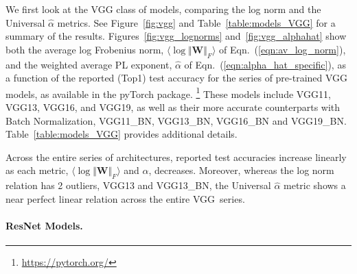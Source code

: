 We first look at the VGG class of models, comparing the log norm and the Universal $\hat{\alpha}$ metrics.
See Figure~\ref{fig:vgg} and Table~\ref{table:models_VGG} for a summary of the results.
Figures~\ref{fig:vgg_lognorms} and~\ref{fig:vgg_alphahat} show both the average log Frobenius norm, $\langle\log\Vert\mathbf{W}\Vert_{F}\rangle$ of Eqn.~(\ref{eqn:av_log_norm}), and the weighted average PL exponent, $\hat{\alpha}$ of Eqn.~(\ref{eqn:alpha_hat_specific}), as a function of the reported (Top1) test accuracy for the series of pre-trained VGG models, as available in the pyTorch package.%
\footnote{\url{https://pytorch.org/}}
These models include VGG11, VGG13, VGG16, and VGG19, as well as their more accurate counterparts with Batch Normalization, VGG11\_BN, VGG13\_BN, VGG16\_BN and VGG19\_BN. 
Table~\ref{table:models_VGG} provides additional details.

Across the entire series of architectures, 
reported test accuracies increase linearly as each metric, 
$\langle\log\Vert\mathbf{W}\Vert_{F}\rangle$
and 
$\hat{\alpha}$,
decreases.
Moreover, whereas the log norm relation has 2 outliers, VGG13 and VGG13\_BN, the Universal $\hat{\alpha}$ metric shows a near perfect linear relation across the entire VGG~series.

\paragraph{ResNet Models.}

